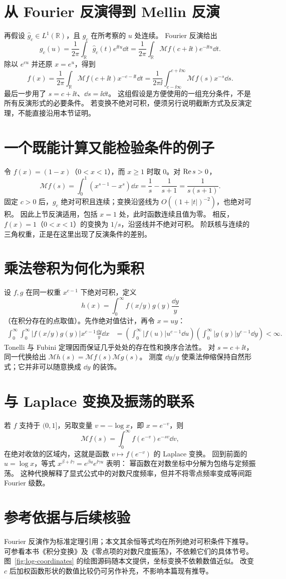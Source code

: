 \documentclass[UTF8,fontset=fandol,11pt]{ctexart}
\begin{document}
\section{从 Fourier 反演得到 Mellin 反演}
再假设 $\widehat g_c\in L^1(\mathbb R)$，且 $g_c$ 在所考察的 $u$ 处连续。
Fourier 反演给出
\[
 g_c(u)=\frac1{2\pi}\int_{\mathbb R}\widehat g_c(t)e^{\ii tu}\dd t
       =\frac1{2\pi}\int_{\mathbb R}\mathcal Mf(c+\ii t)e^{-\ii tu}\dd t.
\]
除以 $e^{cu}$ 并还原 $x=e^u$，得到
\[
 f(x)=\frac1{2\pi}\int_{\mathbb R}\mathcal Mf(c+\ii t)x^{-c-\ii t}\dd t
 =\frac1{2\pi\ii}\int_{c-\ii\infty}^{c+\ii\infty}
                 \mathcal Mf(s)x^{-s}\dd s.
\]
最后一步用了 $s=c+\ii t$、$\dd s=\ii\dd t$。
这组假设是方便使用的一组充分条件，不是所有反演形式的必要条件。
若变换不绝对可积，便须另行说明截断方式及反演定理，不能直接沿用本节证明。

\section{一个既能计算又能检验条件的例子}
令 $f(x)=(1-x)$（$0<x<1$），而 $x\ge1$ 时取 $0$。对 $\operatorname{Re} s>0$，
\[
 \mathcal Mf(s)=\int_0^1(x^{s-1}-x^s)\dd x
 =\frac1s-\frac1{s+1}=\frac1{s(s+1)}.
\]
固定 $c>0$ 后，$g_c$ 绝对可积且连续；变换沿竖线为 $O((1+|t|)^{-2})$，也绝对可积。
因此上节反演适用，包括 $x=1$ 处，此时函数连续且值为零。
相反，$f(x)=1$（$0<x<1$）的变换为 $1/s$，沿竖线并不绝对可积。
阶跃核与连续的三角权重，正是在这里出现了反演条件的差别。

\section{乘法卷积为何化为乘积}
设 $f,g$ 在同一权重 $x^{c-1}$ 下绝对可积，定义
\[
 h(x)=\int_0^\infty f(x/y)g(y)\frac{\dd y}{y}
\]
（在积分存在的点取值）。先作绝对值估计，再令 $x=uy$：
\begin{align*}
 \int_0^\infty\int_0^\infty
 |f(x/y)g(y)|x^{c-1}\frac{\dd y}{y}\dd x
 &=\left(\int_0^\infty |f(u)|u^{c-1}\dd u\right)
   \left(\int_0^\infty |g(y)|y^{c-1}\dd y\right)<\infty.
\end{align*}
Tonelli 与 Fubini 定理因而保证几乎处处的存在性和换序合法性。
对 $s=c+\ii t$，同一代换给出
$\mathcal Mh(s)=\mathcal Mf(s)\mathcal Mg(s)$。
测度 $\dd y/y$ 使乘法伸缩保持自然形式；它并非可以随意换成 $\dd y$ 的装饰。

\section{与 Laplace 变换及振荡的联系}
若 $f$ 支持于 $(0,1]$，另取变量 $v=-\log x$，即 $x=e^{-v}$，则
\[
 \mathcal Mf(s)=\int_0^\infty f(e^{-v})e^{-sv}\dd v,
\]
在绝对收敛的区域内，这就是函数 $v\mapsto f(e^{-v})$ 的 Laplace 变换。
回到前面的 $u=\log x$，等式 $x^{\beta+\ii\gamma}=e^{\beta u}e^{\ii\gamma u}$ 表明：
幂函数在对数坐标中分解为包络与定频振荡。
这种代换解释了显式公式中的对数尺度频率，但并不将零点频率变成等间距 Fourier 级数。

\section*{参考依据与后续核验}
Fourier 反演作为标准定理引用；本文其余恒等式均在所列绝对可积条件下推导。
可参看本书《积分变换》及《零点项的对数尺度振荡》，不依赖它们的具体节号。
图~\ref{fig:log-coordinates} 的绘图源码随本文提供，坐标变换不依赖数值近似。
改变 $c$ 后加权函数形状的数值比较仍可另作补充，不影响本篇现有推导。
\end{document}
